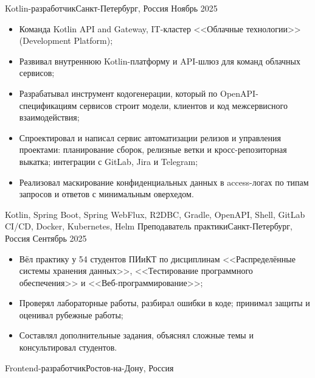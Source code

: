 
\begin{experiences}
   {Kotlin-разработчик}{}{Санкт-Петербург, Россия}
    {Ноябрь 2025}  {
                     \begin{itemize}
                     \item Команда Kotlin API and Gateway, IT-кластер <<Облачные технологии>> (Development Platform);
                     \item Развивал внутреннюю Kotlin-платформу и API-шлюз для команд облачных сервисов;
                     \item Разрабатывал инструмент кодогенерации, который по OpenAPI-спецификациям сервисов строит модели, клиентов и код межсервисного взаимодействия;
                     \item Спроектировал и написал сервис автоматизации релизов и управления проектами: планирование сборок, релизные ветки и кросс-репозиторная выкатка; интеграции с GitLab, Jira и Telegram;
                     \item Реализовал маскирование конфиденциальных данных в access-логах по типам запросов и ответов с минимальным оверхедом.
                     \end{itemize}
                  }
                  {Kotlin, Spring Boot, Spring WebFlux, R2DBC, Gradle, OpenAPI, Shell, GitLab CI/CD, Docker, Kubernetes, Helm}
  \emptySeparator
   {Преподаватель практики}{}{Санкт-Петербург, Россия}
    {Сентябрь 2025}  {
                     \begin{itemize}
                     \item Вёл практику у 54 студентов ПИиКТ по дисциплинам <<Распределённые системы хранения данных>>, <<Тестирование программного обеспечения>> и <<Веб-программирование>>;
                     \item Проверял лабораторные работы, разбирал ошибки в коде; принимал защиты и оценивал рубежные работы;
                     \item Составлял дополнительные задания, объяснял сложные темы и консультировал студентов.
                     \end{itemize}
                  }
                  {}
  \emptySeparator
   {Frontend-разработчик}{}{Ростов-на-Дону, Россия}

\end{experiences}
